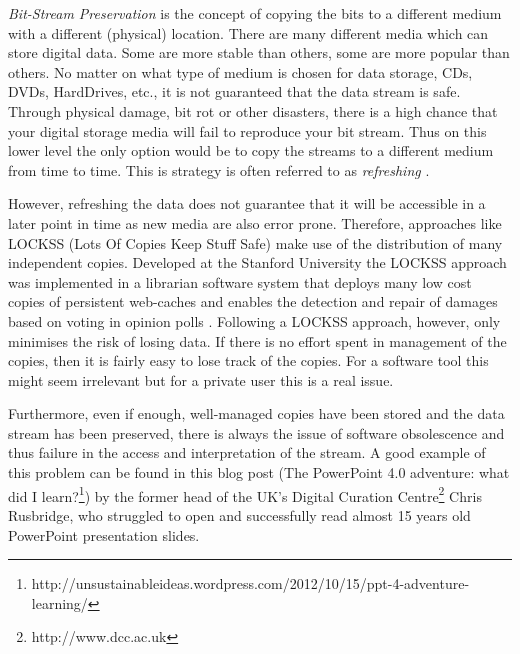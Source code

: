 \textit{Bit-Stream Preservation}
is the concept of copying the bits to a different medium with a different (physical) location. There are many different media which can store digital data. Some are more stable than others, some are more popular than others. No matter on what type of medium is chosen for data storage, CDs, DVDs, HardDrives, etc., it is not guaranteed that the data stream is safe. Through physical damage, bit rot or other disasters, there is a high chance that your digital storage media will fail to reproduce your bit stream. Thus on this lower level the only option would be to copy the streams to a different medium from time to time. This is strategy is often referred to as \textit{refreshing} \cite{Lee:2002:SOTADP}.

However, refreshing the data does not guarantee that it will be accessible in a later point in time as new media are also error prone. Therefore, approaches like LOCKSS (Lots Of Copies Keep Stuff Safe) \cite{reich2001lpw} make use of the distribution of many independent copies. Developed at the Stanford University the LOCKSS approach was implemented in a librarian software system that deploys many low cost copies of persistent web-caches and enables the detection and repair of damages based on voting in opinion polls \cite{Maniatis:2003:PPR:1165389.945451}.
Following a LOCKSS approach, however, only minimises the risk of losing data. If there is no effort spent in management of the copies, then it is fairly easy to lose track of the copies. For a software tool this might seem irrelevant but for a private user this is a real issue.

Furthermore, even if enough, well-managed copies have been stored and the data stream has been preserved, there is always the issue of software obsolescence and thus failure in the access and interpretation of the stream. A good example of this problem can be found in this blog post (The PowerPoint 4.0 adventure: what did I learn?\footnote{http://unsustainableideas.wordpress.com/2012/10/15/ppt-4-adventure-learning/}) by the former head of the UK's Digital Curation Centre\footnote{http://www.dcc.ac.uk} Chris Rusbridge, who struggled to open and successfully read almost 15 years old PowerPoint presentation slides. \newline

